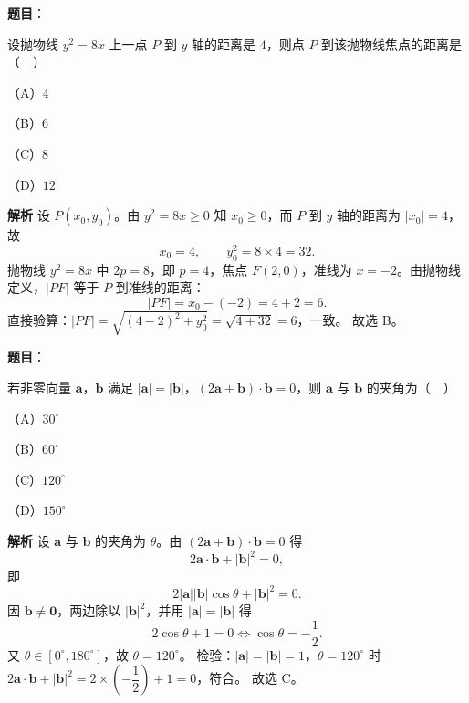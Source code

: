 \begin{answer}

\textbf{题目}：

设抛物线 $y^2=8x$ 上一点 $P$ 到 $y$ 轴的距离是 $4$，则点 $P$ 到该抛物线焦点的距离是（　）

（A）$4$

（B）$6$

（C）$8$

（D）$12$

\textbf{解析}
设 $P(x_0,y_0)$。由 $y^2=8x\geqslant0$ 知 $x_0\geqslant0$，而 $P$ 到 $y$ 轴的距离为 $|x_0|=4$，故
\nopagebreak[4]
\[x_0=4,\qquad y_0^2=8\times4=32.\]
抛物线 $y^2=8x$ 中 $2p=8$，即 $p=4$，焦点 $F(2,0)$，准线为 $x=-2$。由抛物线定义，$|PF|$ 等于 $P$ 到准线的距离：
\nopagebreak[4]
\[|PF|=x_0-\left(-2\right)=4+2=6.\]
直接验算：$|PF|=\sqrt{(4-2)^2+y_0^2}=\sqrt{4+32}=6$，一致。
故选 B。


\end{answer}
\begin{answer}

\textbf{题目}：

若非零向量 $\boldsymbol a$，$\boldsymbol b$ 满足 $|\boldsymbol a|=|\boldsymbol b|$，$(2\boldsymbol a+\boldsymbol b)\cdot\boldsymbol b=0$，则 $\boldsymbol a$ 与 $\boldsymbol b$ 的夹角为（　）

（A）$30^\circ$

（B）$60^\circ$

（C）$120^\circ$

（D）$150^\circ$

\textbf{解析}
设 $\boldsymbol a$ 与 $\boldsymbol b$ 的夹角为 $\theta$。由 $(2\boldsymbol a+\boldsymbol b)\cdot\boldsymbol b=0$ 得
\nopagebreak[4]
\[2\boldsymbol a\cdot\boldsymbol b+|\boldsymbol b|^2=0,\]
即
\nopagebreak[4]
\[2|\boldsymbol a||\boldsymbol b|\cos\theta+|\boldsymbol b|^2=0.\]
因 $\boldsymbol b\neq\boldsymbol 0$，两边除以 $|\boldsymbol b|^2$，并用 $|\boldsymbol a|=|\boldsymbol b|$ 得
\nopagebreak[4]
\[2\cos\theta+1=0\iff\cos\theta=-\frac12.\]
又 $\theta\in[0^\circ,180^\circ]$，故 $\theta=120^\circ$。
检验：$|\boldsymbol a|=|\boldsymbol b|=1$，$\theta=120^\circ$ 时 $2\boldsymbol a\cdot\boldsymbol b+|\boldsymbol b|^2=2\times\left(-\dfrac12\right)+1=0$，符合。
故选 C。


\end{answer}
